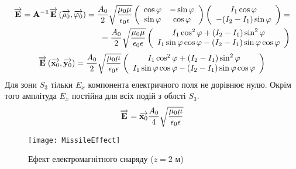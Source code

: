 \textcolor{lightgray} { \begin{equation*} \begin{aligned}
\overrightarrow{\mathbf E} = 
\mathbf{A^{-1}} \overrightarrow{\mathbf E} \left( \overrightarrow{\mathbf \rho_0}, \overrightarrow{\mathbf \varphi_0} \right) = 
\frac{A_0}{2} \sqrt{\frac{\mu_0 \mu}{\epsilon_0 \epsilon}}
\left( \begin{array}{cc} \cos \varphi & - \sin \varphi \\
\sin \varphi & \cos \varphi \end{array} \right)
\left( \begin{array}{c} I_1 \cos \varphi \\
- (I_2 - I_1) \sin \varphi \end{array} \right) = \\
= \frac{A_0}{2} \sqrt{\frac{\mu_0 \mu}{\epsilon_0 \epsilon}}
\left( \begin{array}{c} I_1 \cos^2 \varphi + (I_2 - I_1) \sin^2 \varphi \\
I_1 \sin \varphi \cos \varphi - (I_2 - I_1) 
\sin \varphi \cos \varphi \end{array} \right)
\end{aligned} \end{equation*} }
%
\begin{equation*} \begin{aligned}
\overrightarrow{\mathbf E} \left( \overrightarrow{\mathbf x_0}, \overrightarrow{\mathbf y_0} \right) = \frac{A_0}{2} 
\sqrt{\frac{\mu_0 \mu}{\epsilon_0 \epsilon}} \left( \begin{array}{c} 
I_1 \cos^2 \varphi + (I_2 - I_1) \sin^2 \varphi \\
I_1 \sin \varphi \cos \varphi - (I_2 - I_1) 
\sin \varphi \cos \varphi \end{array} \right)
\end{aligned} \end{equation*}
%
Для зони $ S_3 $ тільки $ E_x $ компонента електричного поля не дорівнює
нулю. Окрім того амплітуда $ E_x $ постійна для всіх подій з облсті $ S_3 $.
%
\begin{equation*} \begin{aligned}
\overrightarrow{\mathbf E} = \overrightarrow{\mathbf x_0} \frac{A_0}{4} 
\sqrt{\frac{\mu_0 \mu}{\epsilon_0 \epsilon}}
\end{aligned} \end{equation*}
%
\begin{figure}[h] \begin{center}
\texttt{[image: MissileEffect]}
\caption{Ефект електромагнітного снаряду ($ z = 2 $ м)} \label{fig:emp_rho}
\end{center} \end{figure}
